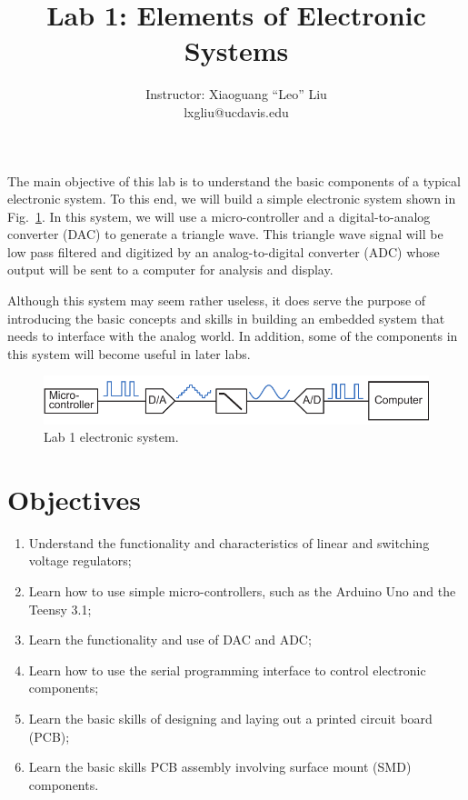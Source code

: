 \documentclass[letterpaper, 11pt]{article}
\begin{document}
\title{Lab 1: Elements of Electronic Systems}
\author{Instructor: Xiaoguang ``Leo'' Liu\\lxgliu@ucdavis.edu}
\date{}

\maketitle

The main objective of this lab is to understand the basic components of a typical electronic system. To this end, we will build a simple electronic system shown in Fig.~\ref{fig:lab1-system}. In this system, we will use a micro-controller and a digital-to-analog converter (DAC) to generate a triangle wave. This triangle wave signal will be low pass filtered and digitized by an analog-to-digital converter (ADC) whose output will be sent to a computer for analysis and display.

Although this system may seem rather useless, it does serve the purpose of introducing the basic concepts and skills in building an embedded system that needs to interface with the analog world. In addition, some of the components in this system will become useful in later labs. 

\begin{figure}[h]
	\centering
	\includegraphics{lab1-system}
	\caption{Lab 1 electronic system.}
	\label{fig:lab1-system}
\end{figure}

\section{Objectives}

\begin{enumerate}[itemsep=0.1ex]
	\item Understand the functionality and characteristics of linear and switching voltage regulators;
	\item Learn how to use simple micro-controllers, such as the Arduino Uno and the Teensy 3.1;
	\item Learn the functionality and use of DAC and ADC;
	\item Learn how to use the serial programming interface to control electronic components;
	\item Learn the basic skills of designing and laying out a printed circuit board (PCB);
	\item Learn the basic skills PCB assembly involving surface mount (SMD) components.
\end{enumerate}
\end{document}
